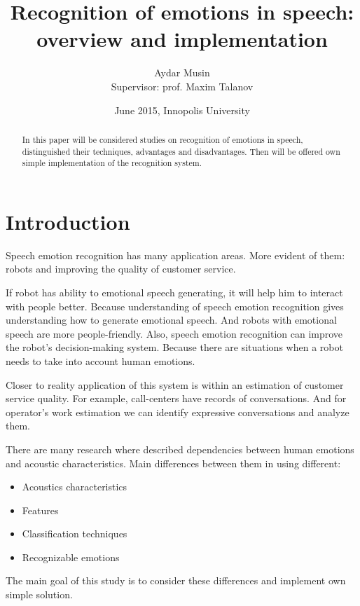 \documentclass[12pt, letterpaper]{article}
\title{Recognition of emotions in speech:\\overview and implementation}
\author{Aydar Musin\\Supervisor: prof. Maxim Talanov}
\date{June 2015, Innopolis University}
\begin{document}
\begin{titlepage}
\maketitle
\end{titlepage}

\begin{abstract}
In this paper will be considered studies on recognition of emotions in speech, distinguished their techniques, advantages and disadvantages. Then will be offered own simple implementation of the recognition system.
\end{abstract}

\section{Introduction}

Speech emotion recognition has many application areas. More evident of them: robots and improving the quality of customer service.

If robot has ability to emotional speech generating, it will help him to interact with people better. Because understanding of speech emotion recognition gives understanding how to generate emotional speech. And robots with emotional speech are more people-friendly. Also, speech emotion recognition can improve the robot's decision-making system. Because there are situations when a robot needs to take into account human emotions. %

Closer to reality application of this system is within an estimation of customer service quality. For example, call-centers have records of conversations. And for operator's work estimation we can identify expressive conversations and analyze them.

There are many research where described dependencies between human emotions and acoustic characteristics. Main differences between them in using different:
\begin{itemize}
	\item Acoustics characteristics
	\item Features
	\item Classification techniques
	\item Recognizable emotions
\end{itemize}

The main goal of this study is to consider these differences and implement own simple solution.
\\
\\
\\
\\
\end{document}
